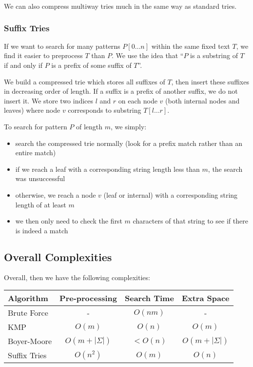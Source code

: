 \documentclass[12pt]{article}
\begin{document}
We can also compress multiway tries much in the same way as standard tries.

\subsubsection{Suffix Tries}
If we want to search for many patterns $P[0\dots n]$ within the same fixed text $T$, we find it easier to preprocess $T$ than $P$. We use the idea that ``$P$ is a substring of $T$ if and only if $P$ is a prefix of some suffix of $T$''.

We build a compressed trie which stores all suffixes of $T$, then insert these suffixes in decreasing order of length. If a suffix is a prefix of another suffix, we do not insert it. We store two indices $l$ and $r$ on each node $v$ (both internal nodes and leaves) where node $v$ corresponds to substring $T[l\dots r]$.

To search for pattern $P$ of length $m$, we simply:
\begin{itemize}
\item search the compressed trie normally (look for a prefix match rather than an entire match)
\item if we reach a leaf with a corresponding string length less than $m$, the search was unsuccessful
\item otherwise, we reach a node $v$ (leaf or internal) with a corresponding string length of at least $m$
\item we then only need to check the first $m$ characters of that string to see if there is indeed a match
\end{itemize}

\subsection{Overall Complexities}
Overall, then we have the following complexities:
\begin{table}[ht]
\centering
  \begin{tabular}{|l|c|c|c|}
  \hline
  Algorithm & Pre-processing & Search Time & Extra Space \\
  \hline
  \hline
  Brute Force & - & $O(nm)$ & - \\
  KMP & $O(m)$ & $O(n)$ & $O(m)$ \\
  Boyer-Moore & $O(m + |\Sigma|)$ & $<O(n)$ & $O(m + |\Sigma|)$ \\
  Suffix Tries & $O(n^2)$ & $O(m)$ & $O(n)$ \\
  \hline
  \end{tabular}
\end{table}
\end{document}
